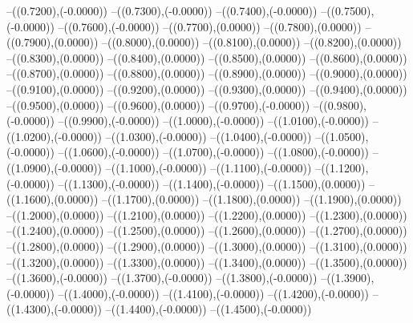 {	--({\sx*(0.7200)},{\sy*(-0.0000)})
	--({\sx*(0.7300)},{\sy*(-0.0000)})
	--({\sx*(0.7400)},{\sy*(-0.0000)})
	--({\sx*(0.7500)},{\sy*(-0.0000)})
	--({\sx*(0.7600)},{\sy*(-0.0000)})
	--({\sx*(0.7700)},{\sy*(0.0000)})
	--({\sx*(0.7800)},{\sy*(0.0000)})
	--({\sx*(0.7900)},{\sy*(0.0000)})
	--({\sx*(0.8000)},{\sy*(0.0000)})
	--({\sx*(0.8100)},{\sy*(0.0000)})
	--({\sx*(0.8200)},{\sy*(0.0000)})
	--({\sx*(0.8300)},{\sy*(0.0000)})
	--({\sx*(0.8400)},{\sy*(0.0000)})
	--({\sx*(0.8500)},{\sy*(0.0000)})
	--({\sx*(0.8600)},{\sy*(0.0000)})
	--({\sx*(0.8700)},{\sy*(0.0000)})
	--({\sx*(0.8800)},{\sy*(0.0000)})
	--({\sx*(0.8900)},{\sy*(0.0000)})
	--({\sx*(0.9000)},{\sy*(0.0000)})
	--({\sx*(0.9100)},{\sy*(0.0000)})
	--({\sx*(0.9200)},{\sy*(0.0000)})
	--({\sx*(0.9300)},{\sy*(0.0000)})
	--({\sx*(0.9400)},{\sy*(0.0000)})
	--({\sx*(0.9500)},{\sy*(0.0000)})
	--({\sx*(0.9600)},{\sy*(0.0000)})
	--({\sx*(0.9700)},{\sy*(-0.0000)})
	--({\sx*(0.9800)},{\sy*(-0.0000)})
	--({\sx*(0.9900)},{\sy*(-0.0000)})
	--({\sx*(1.0000)},{\sy*(-0.0000)})
	--({\sx*(1.0100)},{\sy*(-0.0000)})
	--({\sx*(1.0200)},{\sy*(-0.0000)})
	--({\sx*(1.0300)},{\sy*(-0.0000)})
	--({\sx*(1.0400)},{\sy*(-0.0000)})
	--({\sx*(1.0500)},{\sy*(-0.0000)})
	--({\sx*(1.0600)},{\sy*(-0.0000)})
	--({\sx*(1.0700)},{\sy*(-0.0000)})
	--({\sx*(1.0800)},{\sy*(-0.0000)})
	--({\sx*(1.0900)},{\sy*(-0.0000)})
	--({\sx*(1.1000)},{\sy*(-0.0000)})
	--({\sx*(1.1100)},{\sy*(-0.0000)})
	--({\sx*(1.1200)},{\sy*(-0.0000)})
	--({\sx*(1.1300)},{\sy*(-0.0000)})
	--({\sx*(1.1400)},{\sy*(-0.0000)})
	--({\sx*(1.1500)},{\sy*(0.0000)})
	--({\sx*(1.1600)},{\sy*(0.0000)})
	--({\sx*(1.1700)},{\sy*(0.0000)})
	--({\sx*(1.1800)},{\sy*(0.0000)})
	--({\sx*(1.1900)},{\sy*(0.0000)})
	--({\sx*(1.2000)},{\sy*(0.0000)})
	--({\sx*(1.2100)},{\sy*(0.0000)})
	--({\sx*(1.2200)},{\sy*(0.0000)})
	--({\sx*(1.2300)},{\sy*(0.0000)})
	--({\sx*(1.2400)},{\sy*(0.0000)})
	--({\sx*(1.2500)},{\sy*(0.0000)})
	--({\sx*(1.2600)},{\sy*(0.0000)})
	--({\sx*(1.2700)},{\sy*(0.0000)})
	--({\sx*(1.2800)},{\sy*(0.0000)})
	--({\sx*(1.2900)},{\sy*(0.0000)})
	--({\sx*(1.3000)},{\sy*(0.0000)})
	--({\sx*(1.3100)},{\sy*(0.0000)})
	--({\sx*(1.3200)},{\sy*(0.0000)})
	--({\sx*(1.3300)},{\sy*(0.0000)})
	--({\sx*(1.3400)},{\sy*(0.0000)})
	--({\sx*(1.3500)},{\sy*(0.0000)})
	--({\sx*(1.3600)},{\sy*(-0.0000)})
	--({\sx*(1.3700)},{\sy*(-0.0000)})
	--({\sx*(1.3800)},{\sy*(-0.0000)})
	--({\sx*(1.3900)},{\sy*(-0.0000)})
	--({\sx*(1.4000)},{\sy*(-0.0000)})
	--({\sx*(1.4100)},{\sy*(-0.0000)})
	--({\sx*(1.4200)},{\sy*(-0.0000)})
	--({\sx*(1.4300)},{\sy*(-0.0000)})
	--({\sx*(1.4400)},{\sy*(-0.0000)})
	--({\sx*(1.4500)},{\sy*(-0.0000)})
}
